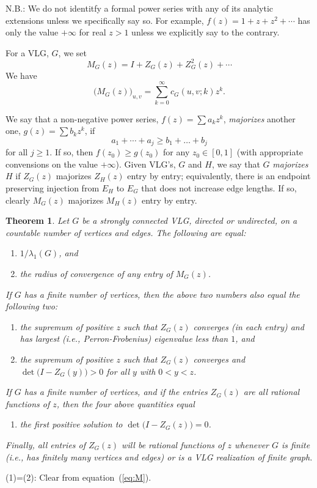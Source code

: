 \documentclass[12pt]{article}
\newtheorem{theorem}{Theorem}[section]
\newcommand{\proof}{{\par\noindent {\bf Proof}\space\space}}
\begin{document}
N.B.: We do not identitfy a formal power series with any of its analytic
extensions unless we specifically say so.  For example,
$f(z)=1+z+z^2+\cdots$ has only the value $+\infty$ for real $z> 1$
unless we explicitly say to the contrary.

For a VLG, $G$, we set
$$
M_G(z) = I + Z_G(z) + Z_G^2(z) + \cdots 
$$
We have
\begin{equation}\label{eq:M}
\bigl( M_G(z) \bigr)_{u,v} = \sum_{k=0}^\infty c_G(u,v;k)z^k.
\end{equation}

We say that a non-negative power series, $f(z)=\sum a_k z^k$, {\em majorizes}
another one, $g(z)=\sum b_k z^k$, if
$$
a_1+\cdots+a_j \ge b_1+\ldots+ b_j
$$
for all $j\ge 1$.  If so, then $f(z_0)\ge g(z_0)$ for any $z_0\in[0,1]$
(with appropriate convensions on the value $+\infty$).  Given VLG's,
$G$ and $H$, we say that $G$ {\em majorizes} $H$ if $Z_G(z)$ majorizes
$Z_H(z)$ entry by entry;
equivalently, there is an endpoint preserving
injection from $E_H$ to $E_G$ that does not increase edge lengths.
If so, clearly $M_G(z)$ majorizes
$M_H(z)$ entry by entry.

\begin{theorem}\label{th:shannon_infinite}
Let $G$ be a strongly connected
VLG, directed or undirected, on a countable number of
vertices and edges.  The following are equal:
\begin{enumerate}
\item $1/\lambda_1(G)$, and
\item the radius of convergence of any entry
of $M_G(z)$.
\end{enumerate}
If $G$ has a finite number of vertices, then the above two numbers also
equal the following two:
\begin{enumerate}\addtocounter{enumi}{2}
\item the supremum of positive $z$ such that
$Z_G(z)$ converges (in each entry)
and has largest (i.e., Perron-Frobenius) eigenvalue
less than $1$, and
\item the supremum of positive $z$ such that 
$Z_G(z)$ converges and $\det\bigl(I-Z_G(y)\bigr)>0$
for all $y$ with $0<y<z$.
\end{enumerate}
If $G$ has a finite number of vertices, and if the entries $Z_G(z)$
are all rational functions of $z$, then the four above quantities equal
\begin{enumerate}\addtocounter{enumi}{4}
\item the first positive solution to $\det\bigl(I-Z_G(z)\bigr)=0$.
\end{enumerate}
Finally, all entries of $Z_G(z)$ will be rational functions of $z$ whenever
$G$ is finite (i.e., has finitely many vertices and edges)
or is a VLG realization of finite graph.
\end{theorem}
\proof (1)=(2): Clear from equation~(\ref{eq:M}).
\end{document}
